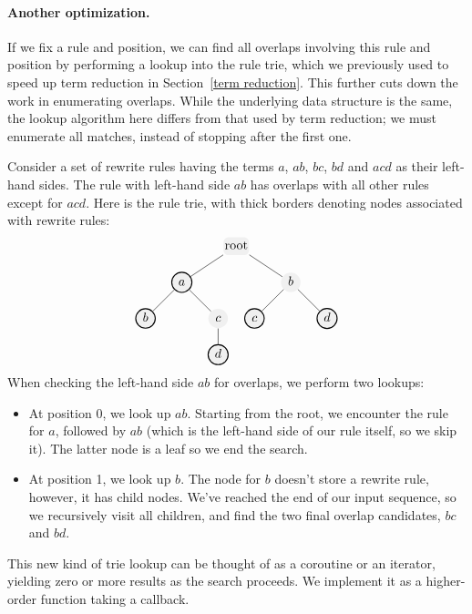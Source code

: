 \documentclass[../generics]{subfiles}
\begin{document}
\paragraph{Another optimization.} If we fix a rule and position, we can find all overlaps involving this rule and position by performing a lookup into the rule trie, which we previously used to speed up term reduction in Section~\ref{term reduction}. This further cuts down the work in enumerating overlaps. While the underlying data structure is the same, the lookup algorithm here differs from that used by term reduction; we must enumerate all matches, instead of stopping after the first one.

Consider a set of rewrite rules having the terms $a$, $ab$, $bc$, $bd$ and $acd$ as their left-hand sides. The rule with left-hand side $ab$ has overlaps with all other rules except for $acd$. Here is the rule trie, with thick borders denoting nodes associated  with rewrite rules:
\[
\begin{tikzpicture}
  [level distance=10mm,
   every node/.style={fill=light-gray!60,circle,inner sep=1pt},
   level 1/.style={sibling distance=30mm},
   level 2/.style={sibling distance=20mm},
   level 3/.style={sibling distance=10mm}]
  \node [rounded corners, rectangle] {\strut root}
     child {node [thick, draw=black] {$\strut a$}
       child {node [thick, draw=black] {$\strut b$}}
       child {node {$\strut c$}
         child {node [thick, draw=black] {$\strut d$}}
       }
     }
     child {node {$\strut b$}
       child {node [thick, draw=black] {$\strut c$}}
       child {node [thick, draw=black] {$\strut d$}}
     };
\end{tikzpicture}
\]
When checking the left-hand side $ab$ for overlaps, we perform two lookups:
\begin{itemize}
\item At position 0, we look up $ab$. Starting from the root, we encounter the rule for $a$, followed by $ab$ (which is the left-hand side of our rule itself, so we skip it). The latter node is a leaf so we end the search.
\item At position 1, we look up $b$. The node for $b$ doesn't store a rewrite rule, however, it has child nodes. We've reached the end of our input sequence, so we recursively visit all children, and find the two final overlap candidates, $bc$ and $bd$.
\end{itemize}
This new kind of trie lookup can be thought of as a coroutine or an iterator, yielding zero or more results as the search proceeds. We implement it as a higher-order function taking a callback.
\end{document}

